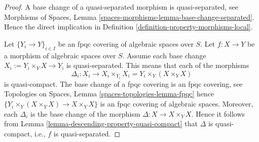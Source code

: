 \documentclass[10pt,a4paper]{amsart}
\theoremstyle{plain}
\theoremstyle{definition}
\theoremstyle{remark}
\numberwithin{equation}{subsection}
\begin{document}
\begin{proof}
A base change of a quasi-separated morphism is quasi-separated, see
Morphisms of Spaces,
Lemma \ref{spaces-morphisms-lemma-base-change-separated}.
Hence the direct implication in
Definition \ref{definition-property-morphisms-local}.

\medskip\noindent
Let $\{Y_i \to Y\}_{i \in I}$ be an fpqc covering of algebraic spaces over $S$.
Let $f : X \to Y$ be a morphism of algebraic spaces over $S$.
Assume each base change $X_i := Y_i \times_Y X \to Y_i$ is quasi-separated.
This means that each of the morphisms
$$
\Delta_i :
X_i
\longrightarrow
X_i \times_{Y_i} X_i = Y_i \times_Y (X \times_Y X)
$$
is quasi-compact. The base change of a fpqc covering is an fpqc covering, see
Topologies on Spaces, Lemma \ref{spaces-topologies-lemma-fpqc}
hence $\{Y_i \times_Y (X \times_Y X) \to X \times_Y X\}$
is an fpqc covering of algebraic spaces. Moreover, each
$\Delta_i$ is the base change of the morphism
$\Delta : X \to X \times_Y X$. Hence it follows from
Lemma \ref{lemma-descending-property-quasi-compact}
that $\Delta$ is quasi-compact, i.e., $f$ is quasi-separated.
\end{proof}
\end{document}
